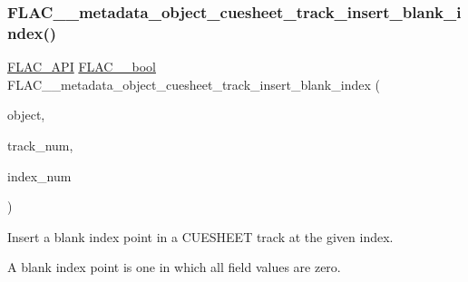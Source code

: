 \subsubsection{\texorpdfstring{FLAC\_\_metadata\_object\_cuesheet\_track\_insert\_blank\_index()}{FLAC\_\_metadata\_object\_cuesheet\_track\_insert\_blank\_index()}}
{\footnotesize\ttfamily \mbox{\hyperlink{group__flac__export_ga56ca07df8a23310707732b1c0007d6f5}{F\+L\+A\+C\+\_\+\+A\+PI}} \mbox{\hyperlink{ordinals_8h_a95103469f1cbd78b8cf250194985b34e}{F\+L\+A\+C\+\_\+\+\_\+bool}} F\+L\+A\+C\+\_\+\+\_\+metadata\+\_\+object\+\_\+cuesheet\+\_\+track\+\_\+insert\+\_\+blank\+\_\+index (\begin{DoxyParamCaption}\item[{\mbox{\hyperlink{struct_f_l_a_c_____stream_metadata}{F\+L\+A\+C\+\_\+\+\_\+\+Stream\+Metadata}} $\ast$}]{object,  }\item[{unsigned}]{track\+\_\+num,  }\item[{unsigned}]{index\+\_\+num }\end{DoxyParamCaption})}

Insert a blank index point in a C\+U\+E\+S\+H\+E\+ET track at the given index.

A blank index point is one in which all field values are zero.



